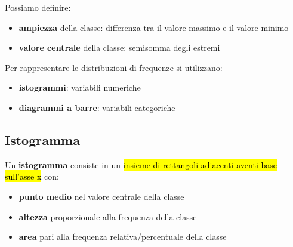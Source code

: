 
Possiamo definire:
\begin{itemize}[label=$\triangleright$]
    \item \textbf{ampiezza} della classe: differenza tra il valore massimo e il valore minimo
    \item \textbf{valore centrale} della classe: semisomma degli estremi
\end{itemize}

\medskip
Per rappresentare le distribuzioni di frequenze si utilizzano:
\begin{itemize}[label=$\diamond$]
    \item \textbf{istogrammi}: variabili numeriche
    \smallskip
    \item \textbf{diagrammi a barre}: variabili categoriche
\end{itemize}

\subsection{Istogramma}
Un \textcolor{viola}{\textbf{istogramma}} consiste in un \hl{insieme di rettangoli adiacenti aventi base sull'asse x} con:
\begin{itemize}
    \item \textbf{punto medio} nel valore centrale della classe
    \smallskip
    \item \textbf{altezza} proporzionale alla frequenza della classe
    \smallskip
    \item \textbf{area} pari alla frequenza relativa/percentuale della classe
\end{itemize}

